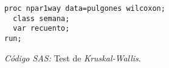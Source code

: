 \documentclass[11pt]{article}
\begin{document}
    \begin{figure}[!h]
      \centering
      \begin{verbatim}
proc npar1way data=pulgones wilcoxon;
  class semana;
  var recuento;
run;
      \end{verbatim}
      \caption{\emph{Código SAS:} Test de \emph{Kruskal-Wallis}.}
      \label{code:sas_8}
    \end{figure}


  \nocite{rano2017}

  
  
\end{document}
